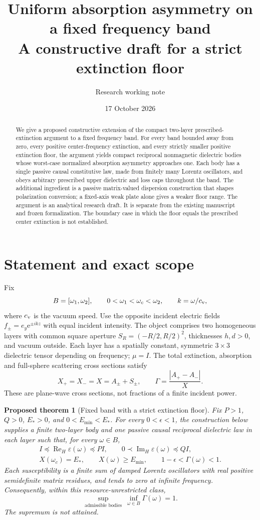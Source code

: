 \documentclass[11pt]{article}
\title{Uniform absorption asymmetry on a fixed frequency band\\
\large A constructive draft for a strict extinction floor}
\author{Research working note}
\date{17 October 2026}
\newtheorem{theorem}{Proposed theorem}
\newcommand{\ReH}{\operatorname{Re}_{H}}
\newcommand{\ImH}{\operatorname{Im}_{H}}
\newcommand{\abs}[1]{\left|#1\right|}
\newcommand{\ey}{e_y}
\newcommand{\ee}{\mathrm e}
\begin{document}
\maketitle
\begin{abstract}
We give a proposed constructive extension of the compact two-layer
prescribed-extinction argument to a fixed frequency band. For every band
bounded away from zero, every positive center-frequency extinction, and every
strictly smaller positive extinction floor, the argument yields compact
reciprocal nonmagnetic dielectric bodies whose worst-case normalized absorption
asymmetry approaches one. Each body has a single passive causal constitutive
law, made from finitely many Lorentz oscillators, and obeys arbitrary prescribed
upper dielectric and loss caps throughout the band. The additional ingredient
is a passive matrix-valued dispersion construction that shapes polarization
conversion; a fixed-axis weak plate alone gives a weaker floor range.
The argument is an analytical research draft. It is separate from the existing
manuscript and frozen formalization. The boundary case in which the floor equals
the prescribed center extinction is not established.
\end{abstract}

\section{Statement and exact scope}
Fix
\[
 B=[\omega_1,\omega_2],\qquad
 0<\omega_1<\omega_c<\omega_2,\qquad
 k=\omega/c_{\rm v},
\]
where $c_{\rm v}$ is the vacuum speed. Use the opposite incident electric fields
$f_\pm=\ey\ee^{\pm ikz}$ with equal incident intensity. The object comprises two
homogeneous layers with common square aperture $S_R=(-R/2,R/2)^2$, thicknesses
$h,d>0$, and vacuum outside. Each layer has a spatially constant, symmetric
$3\times3$ dielectric tensor depending on frequency; $\mu=I$. The total
extinction, absorption and full-sphere scattering cross sections satisfy
\[
 X_+=X_-=X=A_\pm+S_\pm,\qquad
 \Gamma=\frac{\abs{A_+-A_-}}{X}.
\]
These are plane-wave cross sections, not fractions of a finite incident power.

\begin{theorem}[Fixed band with a strict extinction floor]\label{thm:main}
Fix $P>1$, $Q>0$, $E_*>0$, and $0<E_{\min}<E_*$. For every
$0<\epsilon<1$, the construction below supplies a finite two-layer body and
one passive causal reciprocal dielectric law in each layer such that, for
every $\omega\in B$,
\begin{gather}
 I\preceq\ReH\varepsilon(\omega)\preceq PI,\qquad
 0\prec\ImH\varepsilon(\omega)\preceq QI,\label{eq:caps}\\
 X(\omega_c)=E_*,\qquad
 X(\omega)\ge E_{\min},\qquad
 1-\epsilon<\Gamma(\omega)<1.\label{eq:target}
\end{gather}
Each susceptibility is a finite sum of damped Lorentz oscillators with real
positive semidefinite matrix residues, and tends to zero at infinite frequency.
Consequently, within this resource-unrestricted class,
\[
 \sup_{\text{admissible bodies}}\ \inf_{\omega\in B}\Gamma(\omega)=1.
\]
The supremum is not attained.
\end{theorem}
\end{document}
